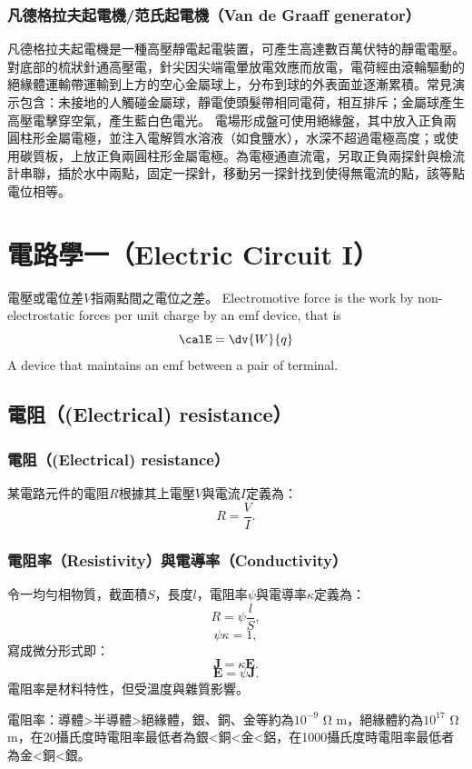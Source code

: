 \documentclass[a4paper,12pt]{report}
\begin{document}
\begin{itemize}
\subsubsection{凡德格拉夫起電機/范氏起電機（Van de Graaff generator）}
凡德格拉夫起電機是一種高壓靜電起電裝置，可產生高達數百萬伏特的靜電電壓。對底部的梳狀針通高壓電，針尖因尖端電暈放電效應而放電，電荷經由滾輪驅動的絕緣體運輸帶運輸到上方的空心金屬球上，分布到球的外表面並逐漸累積。常見演示包含：未接地的人觸碰金屬球，靜電使頭髮帶相同電荷，相互排斥；金屬球產生高壓電擊穿空氣，產生藍白色電光。
電場形成盤可使用絕緣盤，其中放入正負兩圓柱形金屬電極，並注入電解質水溶液（如食鹽水），水深不超過電極高度；或使用碳質板，上放正負兩圓柱形金屬電極。為電極通直流電，另取正負兩探針與檢流計串聯，插於水中兩點，固定一探針，移動另一探針找到使得無電流的點，該等點電位相等。


\section{電路學一（Electric Circuit I）}
電壓或電位差$V$指兩點間之電位之差。
Electromotive force is the work by non-electrostatic forces per unit charge by an emf device, that is
\[\calE=\dv{W}{q}\]
A device that maintains an emf between a pair of terminal.
\subsection{電阻（(Electrical) resistance）}
\subsubsection{電阻（(Electrical) resistance）}
某電路元件的電阻$R$根據其上電壓$V$與電流$I$定義為：
\[R=\frac{V}{I}.\]
\subsubsection{電阻率（Resistivity）與電導率（Conductivity）}
令一均勻相物質，截面積$S$，長度$l$，電阻率$\psi$與電導率$\kappa$定義為：
\[R=\psi\frac{l}{S},\]
\[\psi\kappa=1,\]
寫成微分形式即：
\[\mathbf{J}=\kappa\mathbf{E}.\]
\[\mathbf{E}=\psi\mathbf{J}.\]
電阻率是材料特性，但受溫度與雜質影響。

電阻率：導體>半導體>絕緣體，銀、銅、金等約為$10^{-9}$ Ω m，絕緣體約為$10^{17}$ Ω m，在20攝氏度時電阻率最低者為銀<銅<金<鋁，在1000攝氏度時電阻率最低者為金<銅<銀。

\end{itemize}
\end{document}
